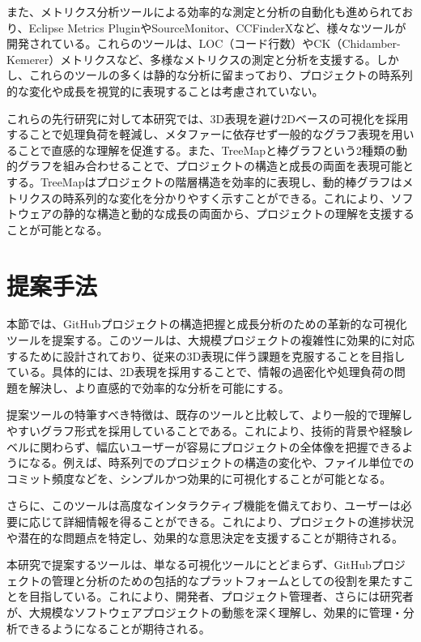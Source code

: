 \documentclass[12pt,twoside]{jbook}
\begin{document}
また、メトリクス分析ツールによる効率的な測定と分析の自動化も進められており、Eclipse Metrics PluginやSourceMonitor、CCFinderXなど、様々なツールが開発されている。これらのツールは、LOC（コード行数）やCK（Chidamber-Kemerer）メトリクスなど、多様なメトリクスの測定と分析を支援する。しかし、これらのツールの多くは静的な分析に留まっており、プロジェクトの時系列的な変化や成長を視覚的に表現することは考慮されていない。

これらの先行研究に対して本研究では、3D表現を避け2Dベースの可視化を採用することで処理負荷を軽減し、メタファーに依存せず一般的なグラフ表現を用いることで直感的な理解を促進する。また、TreeMapと棒グラフという2種類の動的グラフを組み合わせることで、プロジェクトの構造と成長の両面を表現可能とする。TreeMapはプロジェクトの階層構造を効率的に表現し、動的棒グラフはメトリクスの時系列的な変化を分かりやすく示すことができる。これにより、ソフトウェアの静的な構造と動的な成長の両面から、プロジェクトの理解を支援することが可能となる。

\chapter{提案手法}
本節では、GitHubプロジェクトの構造把握と成長分析のための革新的な可視化ツールを提案する。このツールは、大規模プロジェクトの複雑性に効果的に対応するために設計されており、従来の3D表現に伴う課題を克服することを目指している。具体的には、2D表現を採用することで、情報の過密化や処理負荷の問題を解決し、より直感的で効率的な分析を可能にする。

提案ツールの特筆すべき特徴は、既存のツールと比較して、より一般的で理解しやすいグラフ形式を採用していることである。これにより、技術的背景や経験レベルに関わらず、幅広いユーザーが容易にプロジェクトの全体像を把握できるようになる。例えば、時系列でのプロジェクトの構造の変化や、ファイル単位でのコミット頻度などを、シンプルかつ効果的に可視化することが可能となる。

さらに、このツールは高度なインタラクティブ機能を備えており、ユーザーは必要に応じて詳細情報を得ることができる。これにより、プロジェクトの進捗状況や潜在的な問題点を特定し、効果的な意思決定を支援することが期待される。

本研究で提案するツールは、単なる可視化ツールにとどまらず、GitHubプロジェクトの管理と分析のための包括的なプラットフォームとしての役割を果たすことを目指している。これにより、開発者、プロジェクト管理者、さらには研究者が、大規模なソフトウェアプロジェクトの動態を深く理解し、効果的に管理・分析できるようになることが期待される。
\end{document}
